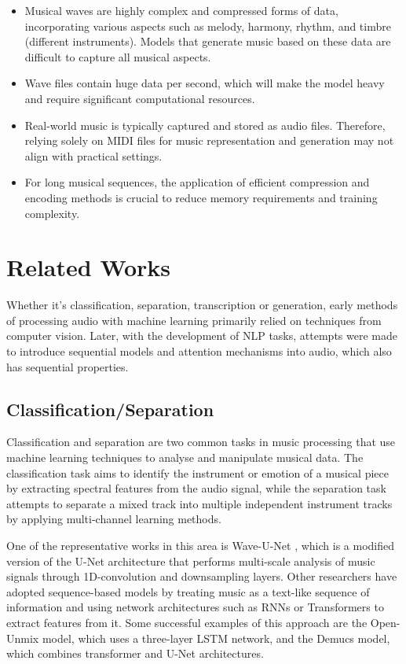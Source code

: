 \documentclass{article}
\begin{document}
\begin{itemize}
\item [$\diamond$] Musical waves are highly complex and compressed forms of data, incorporating various aspects such as melody, harmony, rhythm, and timbre (different instruments). Models that generate music based on these data are difficult to capture all musical aspects.
\item [$\diamond$] Wave files contain huge data per second, which will make the model heavy and require significant computational resources.
\item [$\diamond$] Real-world music is typically captured and stored as audio files. Therefore, relying solely on MIDI files for music representation and generation may not align with practical settings.
\item [$\diamond$] For long musical sequences, the application of efficient compression and encoding methods is crucial to reduce memory requirements and training complexity.
\end{itemize}

\section{Related Works}
Whether it's classification, separation, transcription or generation, early methods of processing audio with machine learning primarily relied on techniques from computer vision. Later, with the development of NLP tasks, attempts were made to introduce sequential models and attention mechanisms into audio, which also has sequential properties.

\subsection{Classification/Separation}

Classification and separation are two common tasks in music processing that use machine learning techniques to analyse and manipulate musical data. The classification task aims to identify the instrument or emotion of a musical piece by extracting spectral features from the audio signal, while the separation task attempts to separate a mixed track into multiple independent instrument tracks by applying multi-channel learning methods.

One of the representative works in this area is Wave-U-Net \citep{stoller2018waveunet}, which is a modified version of the U-Net architecture that performs multi-scale analysis of music signals through 1D-convolution and downsampling layers. Other researchers have adopted sequence-based models 
by treating music as a text-like sequence of information and using network architectures such as RNNs or Transformers to extract features from it. Some successful examples of this approach are the Open-Unmix \citep{stoter2019open} model, which uses a three-layer LSTM network, and the Demucs \citep{defossez2020real} model, which combines transformer and U-Net architectures.
\end{document}
